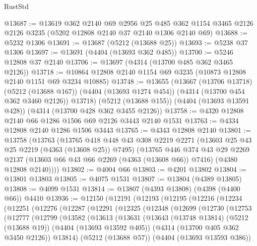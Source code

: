 \begin{lexlean}{RustStd}
\begin{coremodule}
{\begin{coremodule}
{{{{{{{{{{{{{{{{@13687 := @13619
    @362
    @2140
    @69
    @2956
    @25
    @485
    @362
    @1154
    @3465
    @2126
    @2126
    @3235
    (@5202 @12808 @2140 @37 @2140 @1306 @2140 @69)
@13688 := @5232 @1306
@13691 := @13687 (@5212 (@13688 @25))
@13693 := @5238 @37 @1306
@13697 := @13691 (@4404 (@13693 @362 @485))
@13700 := @5246 @12808 @37 @2140
@13706 := @13697 (@4314 (@13700 @485 @362 @3465 @2126))
@13718 := @10864 @12808 @2140 @1154 @69 @3235 (@10873 @12808 @2140 @1151 @69 @3234 @10885)
@13748 := @13655
    (@13667
      (@13706 @13718)
      (@5212 (@13688 @167))
      (@4404 (@13693 @1274 @454))
      (@4314 (@13700 @454 @362 @3460 @2126))
      @13718)
    (@5212 (@13688 @155))
    (@4404 (@13693 @13591 @428))
    (@4314 (@13700 @428 @362 @3455 @2126))
@13758 := @4320 @12808 @2140 @66 @1286 @1506 @69 @2126 @3443 @2140 @1531
@13763 := @4334 @12808 @2140 @1286 @1506 @3443
@13765 := @4343 @12808 @2140
@13801 := @13758
    (@13763
      (@13765
        @418
        @448
        @43
        @308
        @2219
        @2271
        (@13603 @25 @43 @25 @2219 (@4363 (@13608 @25)) @7495)
        (@13765
          @446
          @374
          @43
          @29
          @2269
          @2137
          (@13603 @66 @43 @66 @2269 (@4363 (@13608 @66)) @7416)
          (@4380 @12808 @2140))))
@13802 := @4004 @66
@13803 := @4201 @13802
@13804 := @13801 @13803
@13805 := @4075 @1531
@13807 := @13804 (@4389 @13805)
@13808 := @4099 @1531
@13814 := @13807 (@4393 @13808) (@4398 (@4400 @66)) @4410
@13936 := @12150
    (@12191
      (@12193
        (@12195
          (@12216
            (@12234
              (@12251
                (@12276
                  (@12287
                    (@12291
                      (@12325
                        (@12348
                          (@12699
                            (@12730
                              (@12753
                                (@12777
                                  (@12799
                                    (@13582
                                      (@13613
                                        (@13631
                                          (@13643
                                            (@13748 @13814)
                                            (@5212 (@13688 @19))
                                            (@4404 (@13693 @13592 @405))
                                            (@4314 (@13700 @405 @362 @3450 @2126))
                                            @13814)
                                          (@5212 (@13688 @57))
                                          (@4404 (@13693 @13593 @386))
}}}}}}}}}}}}}}}}
\end{coremodule}}
\end{coremodule}
\end{lexlean}
